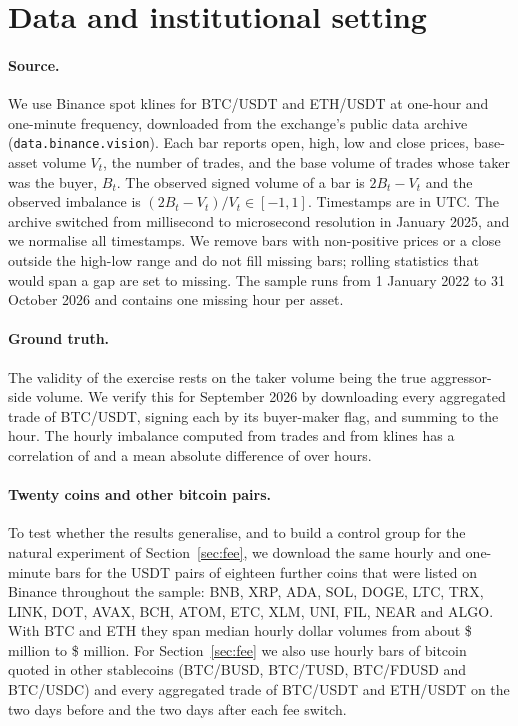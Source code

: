 \documentclass[11pt]{article}
\begin{document}


\section{Data and institutional setting}\label{sec:data}

\paragraph{Source.} We use Binance spot klines for BTC/USDT and ETH/USDT at one-hour and one-minute
frequency, downloaded from the exchange's public data archive (\texttt{data.binance.vision}). Each
bar reports open, high, low and close prices, base-asset volume $V_t$, the number of trades, and the
base volume of trades whose taker was the buyer, $B_t$. The observed signed volume of a bar is
$2B_t-V_t$ and the observed imbalance is $(2B_t-V_t)/V_t\in[-1,1]$. Timestamps are in UTC. The archive
switched from millisecond to microsecond resolution in January 2025, and we normalise all timestamps.
We remove bars with non-positive prices or a close outside the high-low range and do not fill
missing bars; rolling statistics that would span a gap are set to missing. The sample runs from
1 January 2022 to 31 October 2026 and contains one missing hour per asset.

\paragraph{Ground truth.} The validity of the exercise rests on the taker volume being the true
aggressor-side volume. We verify this for September 2026 by downloading every aggregated trade of
BTC/USDT, signing each by its buyer-maker flag, and summing to the hour. The hourly imbalance computed
from trades and from klines has a correlation of \aggCorr{} and a mean absolute difference of
\aggMAD{} over \aggHours{} hours.

\paragraph{Twenty coins and other bitcoin pairs.} To test whether the results generalise, and to
build a control group for the natural experiment of Section~\ref{sec:fee}, we download the same
hourly and one-minute bars for the USDT pairs of eighteen further coins that were listed on Binance
throughout the sample: BNB, XRP, ADA, SOL, DOGE, LTC, TRX, LINK, DOT, AVAX, BCH, ATOM, ETC, XLM,
UNI, FIL, NEAR and ALGO. With BTC and ETH they span median hourly dollar volumes from about
\$\panelVolMin{} million to \$\panelVolMax{} million. For Section~\ref{sec:fee} we also use hourly
bars of bitcoin quoted in other stablecoins (BTC/BUSD, BTC/TUSD, BTC/FDUSD and BTC/USDC) and every
aggregated trade of BTC/USDT and ETH/USDT on the two days before and the two days after each fee
switch.
\end{document}
